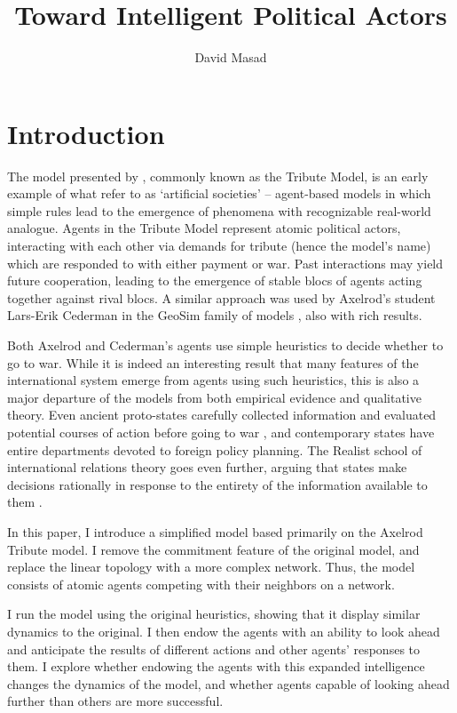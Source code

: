 \documentclass{article}
\begin{document}
\title{Toward Intelligent Political Actors}
	\author{David Masad}
	\maketitle

\section{Introduction}
The model presented by \citet{axelrod_1997}, commonly known as the Tribute Model, is an early example of what \citet{epstein_1996} refer to as `artificial societies' -- agent-based models in which simple rules lead to the emergence of phenomena with recognizable real-world analogue. Agents in the Tribute Model represent atomic political actors, interacting with each other via demands for tribute (hence the model's name) which are responded to with either payment or war. Past interactions may yield future cooperation, leading to the emergence of stable blocs of agents acting together against rival blocs. A similar approach was used by Axelrod's student Lars-Erik Cederman in the GeoSim family of models \citep{cederman_2003}, also with rich results.

Both Axelrod and Cederman's agents use simple heuristics to decide whether to go to war. While it is indeed an interesting result that many features of the international system emerge from agents using such heuristics, this is also a major departure of the models from both empirical evidence and qualitative theory. Even ancient proto-states carefully collected information and evaluated potential courses of action before going to war \citep{sheldon_1989}, and contemporary states have entire departments devoted to foreign policy planning. The Realist school of international relations theory goes even further, arguing that states make decisions rationally in response to the entirety of the information available to them \citep{waltz_2010}. 

In this paper, I introduce a simplified model based primarily on the Axelrod Tribute model. I remove the commitment feature of the original model, and replace the linear topology with a more complex network. Thus, the model consists of atomic agents competing with their neighbors on a network. 

I run the model using the original heuristics, showing that it display similar dynamics to the original. I then endow the agents with an ability to look ahead and anticipate the results of different actions and other agents' responses to them. I explore whether endowing the agents with this expanded intelligence changes the dynamics of the model, and whether agents capable of looking ahead further than others are more successful. 
\end{document}
